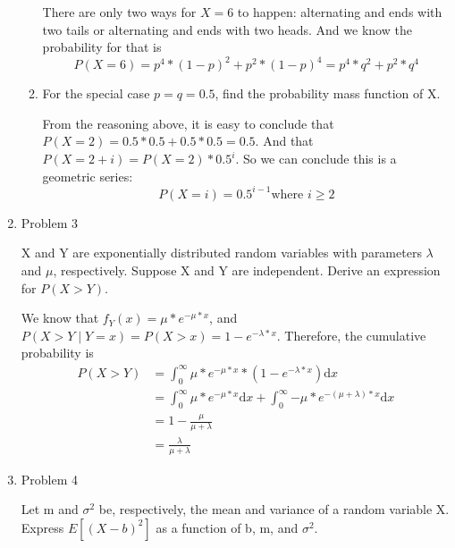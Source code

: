 \documentclass[letterpaper]{article}
\begin{document}
\begin{enumerate}
\begin{enumerate}
There are only two ways for $X=6$ to happen: alternating and ends with two tails or alternating and ends with two heads. And we know the probability for that is
\begin{equation}
P(X = 6) = p^4*(1-p)^2 + p^2*(1-p)^4 = p^4 * q^2 + p^2 * q^4
\end{equation}

\item{}  For the special case $p = q = 0.5$, find the probability mass function of X.

From the reasoning above, it is easy to conclude that $P(X = 2) = 0.5 * 0.5 + 0.5 * 0.5 = 0.5$. And that $P(X = 2 + i) = P(X = 2) * 0.5 ^ i$. So we can conclude this is a geometric series:
\begin{equation}
P(X = i) = 0.5^{i-1} \text{where $i \ge 2$}
\end{equation}


\end{enumerate}
\medskip

\item{Problem 3}
\begin{mdframed}
X and Y are exponentially distributed random variables with parameters $\lambda$ and $\mu$, respectively. Suppose X and Y are independent. Derive an expression for $P(X > Y)$.
\end{mdframed}

We know that $f_Y(x) = \mu * e^{-\mu*x}$, and $P(X > Y \mid Y = x) = P(X > x) = 1 - e^{-\lambda * x}$. Therefore, the cumulative probability is
\begin{equation}
\begin{split}
P(X > Y) &= \int_{0}^{\infty}{\mu * e^{-\mu*x} * (1 - e^{-\lambda * x})} \mathrm{d}x\\
              &= \int_{0}^{\infty}{\mu * e^{-\mu*x}} \mathrm{d}x + \int_{0}^{\infty}{- \mu * e^{- (\mu + \lambda) * x}} \mathrm{d}x\\
              &= 1 - \frac{\mu}{\mu + \lambda}\\
              &= \frac{\lambda}{\mu + \lambda}
\end{split}
\end{equation}
\medskip

\item{Problem 4}
\begin{mdframed}
Let m and $\sigma^2$ be, respectively, the mean and variance of a random variable X. Express $E[(X - b)^2]$ as a function of b, m, and $\sigma^2$.
\end{mdframed}


\end{enumerate}
\end{document}
